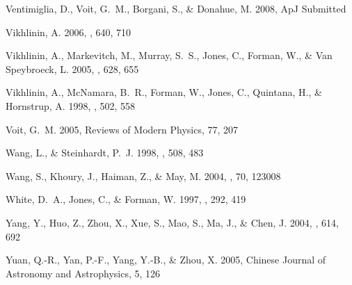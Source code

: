 \documentclass[12pt,preprint]{aastex}
\begin{document}
\begin{thebibliography}{}
{Ventimiglia}, D., {Voit}, G.~M., {Borgani}, S., \& {Donahue}, M. 2008, ApJ
  Submitted

{Vikhlinin}, A. 2006, \apj, 640, 710

{Vikhlinin}, A., {Markevitch}, M., {Murray}, S.~S., {Jones}, C., {Forman}, W.,
  \& {Van Speybroeck}, L. 2005, \apj, 628, 655

{Vikhlinin}, A., {McNamara}, B.~R., {Forman}, W., {Jones}, C., {Quintana}, H.,
  \& {Hornstrup}, A. 1998, \apj, 502, 558

{Voit}, G.~M. 2005, Reviews of Modern Physics, 77, 207

{Wang}, L., \& {Steinhardt}, P.~J. 1998, \apj, 508, 483

{Wang}, S., {Khoury}, J., {Haiman}, Z., \& {May}, M. 2004, \prd, 70, 123008

{White}, D.~A., {Jones}, C., \& {Forman}, W. 1997, \mnras, 292, 419

{Yang}, Y., {Huo}, Z., {Zhou}, X., {Xue}, S., {Mao}, S., {Ma}, J., \& {Chen},
  J. 2004, \apj, 614, 692

{Yuan}, Q.-R., {Yan}, P.-F., {Yang}, Y.-B., \& {Zhou}, X. 2005, Chinese Journal
  of Astronomy and Astrophysics, 5, 126

\end{thebibliography}
\end{document}
